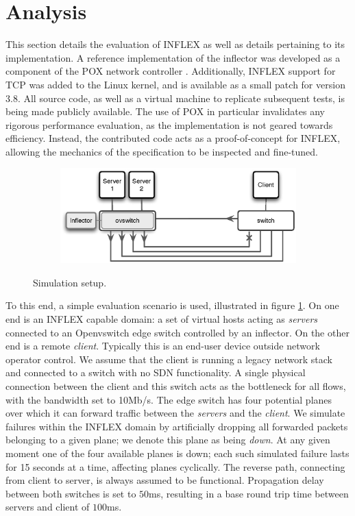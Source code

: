 \section{Analysis}
\label{section:inflex:eval}

This section details the evaluation of INFLEX as well as details pertaining to its implementation.
A reference implementation of the inflector was developed as a component of the POX network controller \cite{pox}.
Additionally, INFLEX support for \ac{TCP} was added to the Linux kernel, and is available as a small patch for version 3.8.
All source code, as well as a virtual machine to replicate subsequent tests, is being made publicly available.
The use of POX in particular invalidates any rigorous performance evaluation, as the implementation is not geared towards efficiency.
Instead, the contributed code acts as a proof-of-concept for INFLEX, allowing the mechanics of the specification to be inspected and fine-tuned.

\begin{figure}
    \begin{subfigure}[b]{1.0\linewidth}
        \centering
        \includegraphics[width=4.0in]{figures/inflex/simtopo.eps}
    \end{subfigure}%
    \caption{Simulation setup. \label{fig:simtopo}}
\end{figure}

To this end, a simple evaluation scenario is used, illustrated in figure \ref{fig:simtopo}.
On one end is an INFLEX capable domain: a set of virtual hosts acting as \emph{servers} connected to an Openvswitch edge switch controlled by an inflector.
On the other end is a remote \emph{client}.
Typically this is an end-user device outside network operator control. We assume that the client is running a legacy network stack and connected to a switch with no \ac{SDN} functionality.
A single physical connection between the client and this switch acts as the bottleneck for all flows, with the bandwidth set to 10Mb/s. The edge switch has four potential planes over which it can forward traffic between the \emph{servers} and the \emph{client}. We simulate failures within the INFLEX domain by artificially dropping all forwarded packets belonging to a given plane; we denote this plane as being \emph{down}. At any given moment one of the four available planes is down; each such simulated failure lasts for 15 seconds at a time, affecting planes cyclically.
The reverse path, connecting from client to server, is always assumed to be functional.
Propagation delay between both switches is set to $50$ms, resulting in a base round trip time between servers and client of $100$ms.

